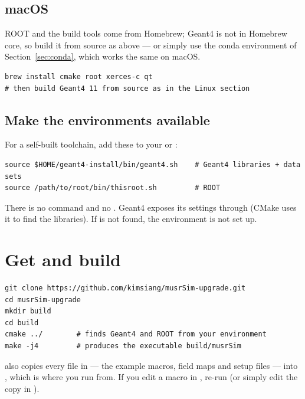 \subsection{macOS}
ROOT and the build tools come from Homebrew; Geant4 is not in Homebrew core, so build it from source as above --- or simply use the conda environment of Section~\ref{sec:conda}, which works the same on macOS.

\begin{lstlisting}[style=sh,caption={macOS: tools via Homebrew, Geant4 from source}]
brew install cmake root xerces-c qt
# then build Geant4 11 from source as in the Linux section
\end{lstlisting}

\subsection{Make the environments available}
For a self-built toolchain, add these to your  or :

\begin{lstlisting}[style=sh,caption={Shell environment for a self-built Geant4 and a ROOT binary}]
source $HOME/geant4-install/bin/geant4.sh    # Geant4 libraries + data sets
source /path/to/root/bin/thisroot.sh         # ROOT
\end{lstlisting}

\begin{pitfall}
There is no  command and no . Geant4 exposes its settings through  (CMake uses it to find the libraries). If  is not found, the environment is not set up.
\end{pitfall}

\section{Get and build \musrSim}
\begin{lstlisting}[style=sh,caption={Clone and build \texttt{musrSim-upgrade}}]
git clone https://github.com/kimsiang/musrSim-upgrade.git
cd musrSim-upgrade
mkdir build
cd build
cmake ../        # finds Geant4 and ROOT from your environment
make -j4         # produces the executable build/musrSim
\end{lstlisting}

 also copies every file in  --- the example macros, field maps and setup files --- into , which is where you run from. If you edit a macro in , re-run  (or simply edit the copy in ).

